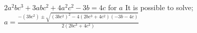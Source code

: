 {$2a^2bc^3+3abc^2+4a^2c^2-3b=4c$ for $a$}
{It is possible to solve; $a = \displaystyle \frac{-(3bc^2) \pm \sqrt{(3bc^2)^2 - 4 (2bc^3+4c^2)(-3b-4c)}}{2(2bc^3+4c^2)}$}
